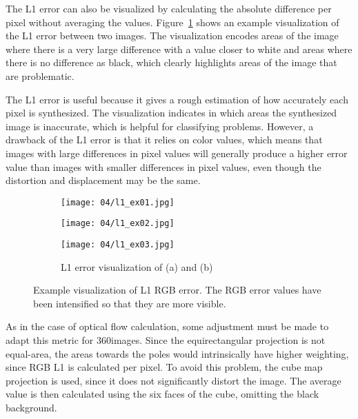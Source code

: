 The L1 error can also be visualized by calculating the absolute difference per pixel without averaging the values. Figure~\ref{fig:l1_example} shows an example visualization of the L1 error between two images. The visualization encodes areas of the image where there is a very large difference with a value closer to white and areas where there is no difference as black, which clearly highlights areas of the image that are problematic.

The L1 error is useful because it gives a rough estimation of how accurately each pixel is synthesized. The visualization indicates in which areas the synthesized image is inaccurate, which is helpful for classifying problems. However, a drawback of the L1 error is that it relies on color values, which means that images with large differences in pixel values will generally produce a higher error value than images with smaller differences in pixel values, even though the distortion and displacement may be the same. 

\begin{figure}
\centering
    \hfill
    \begin{subfigure}[t]{0.3\textwidth}
            \centering
            \texttt{[image: 04/l1\_ex01.jpg]}
            \caption{}
    \end{subfigure}%
    \hfill
    \begin{subfigure}[t]{0.3\textwidth}
            \centering
            \texttt{[image: 04/l1\_ex02.jpg]}
            \caption{}
    \end{subfigure}
    \hfill
    \begin{subfigure}[t]{0.3\textwidth}
            \centering
            \texttt{[image: 04/l1\_ex03.jpg]}
            \caption{L1 error visualization of (a) and (b)}
    \end{subfigure}%
    \hfill
    \hfill
  \caption[Example visualization of L1 RGB error]{Example visualization of L1 RGB error. The RGB error values have been intensified so that they are more visible.} \label{fig:l1_example}
\end{figure}

As in the case of optical flow calculation, some adjustment must be made to adapt this metric for 360\degree images. Since the equirectangular projection is not equal-area, the areas towards the poles would intrinsically have higher weighting, since RGB L1 is calculated per pixel. To avoid this problem, the cube map projection is used, since it does not significantly distort the image. The average value is then calculated using the six faces of the cube, omitting the black background.

